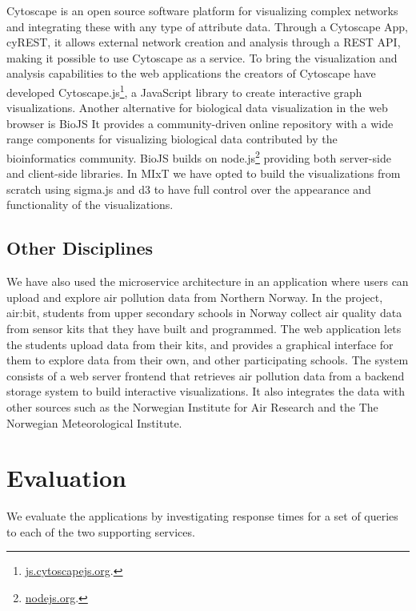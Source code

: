 Cytoscape is an open source software platform for visualizing complex networks
and integrating these with any type of attribute
data.\cite{shannon2003cytoscape} Through a Cytoscape App, cyREST, it allows
external network creation and analysis through a REST API\cite{ono2015cyrest},
making it possible to use Cytoscape as a service.  To bring the visualization
and analysis capabilities to the web applications the creators of Cytoscape have
developed Cytoscape.js\footnote{\url{js.cytoscapejs.org}.}, a JavaScript library
to create interactive graph visualizations.  Another alternative for biological
data visualization in the web browser is BioJS It provides a community-driven
online repository with a wide range components for visualizing biological data
contributed by the bioinformatics community.\cite{gomez2013biojs} BioJS builds
on node.js\footnote{\url{nodejs.org}.} providing both server-side and
client-side libraries. In MIxT we have opted to build the visualizations from
scratch using sigma.js and d3 to have full control over the appearance and
functionality of the visualizations. 

\subsection{Other Disciplines}
We have also used the microservice architecture in an application where users
can upload and explore air pollution data from Northern
Norway.\cite{fjukstad2018low} In the project, air:bit, students from upper
secondary schools in Norway collect air quality data from sensor kits that they
have built and programmed. The web application lets the students upload data
from their kits, and provides a graphical interface for them to explore data
from their own, and other participating schools. The system consists of a web
server frontend that retrieves air pollution data from a backend storage system
to build interactive visualizations. It also integrates the data with other
sources such as the Norwegian Institute for Air Research and the The Norwegian
Meteorological Institute. 

\section{Evaluation} 
We evaluate the applications by investigating response times for a set of queries
to each of the two supporting services. 

